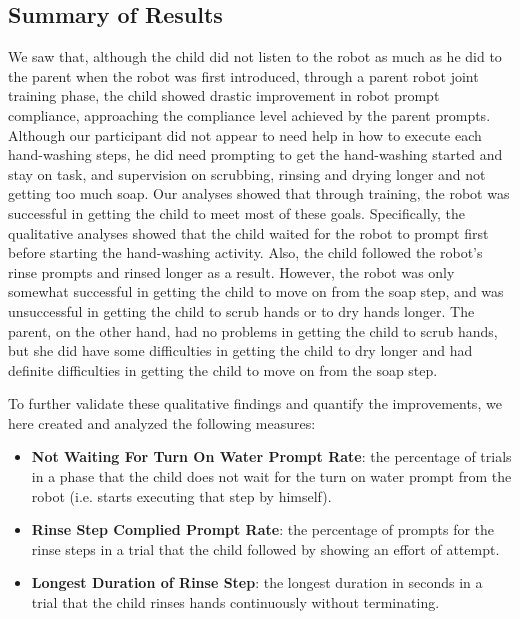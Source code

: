 \subsection{Summary of Results}
We saw that, although the child did not listen to the robot as much as he did to the parent when the robot was first introduced, through a parent robot joint training phase, the child showed drastic improvement in robot prompt compliance, approaching the compliance level achieved by the parent prompts.  Although our participant did not appear to need help in how to execute each hand-washing steps, he did need prompting to get the hand-washing started and stay on task, and supervision on scrubbing, rinsing and drying longer and not getting too much soap.  Our analyses showed that through training, the robot was successful in getting the child to meet most of these goals.  Specifically, the qualitative analyses showed that the child waited for the robot to prompt first before starting the hand-washing activity.  Also, the child followed the robot's rinse prompts and rinsed longer as a result.  However, the robot was only somewhat successful in getting the child to move on from the soap step, and was unsuccessful in getting the child to scrub hands or to dry hands longer.  The parent, on the other hand, had no problems in getting the child to scrub hands, but she did have some difficulties in getting the child to dry longer and had definite difficulties in getting the child to move on from the soap step.

%
To further validate these qualitative findings and quantify the improvements, we here created and analyzed the following measures:
\begin{itemize}
	\item \textbf{Not Waiting For Turn On Water Prompt Rate}: the percentage of trials in a phase that the child does not wait for the turn on water prompt from the robot (i.e. starts executing that step by himself).
	\item \textbf{Rinse Step Complied Prompt Rate}: the percentage of prompts for the rinse steps in a trial that the child followed by showing an effort of attempt.
	\item \textbf{Longest Duration of Rinse Step}: the longest duration in seconds in a trial that the child rinses hands continuously without terminating.
\end{itemize}
